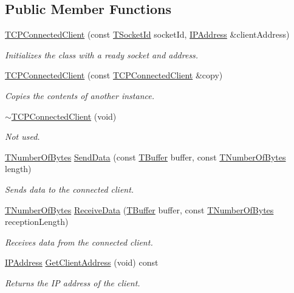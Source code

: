 \subsection*{Public Member Functions}
\begin{DoxyCompactItemize}
\item 
\hyperlink{class_t_c_p_connected_client_a6e1c47791a6603dfe5cacf425587f27b}{T\-C\-P\-Connected\-Client} (const \hyperlink{class_socket_base_aad53265037e46768af4d6a0c2ebed277}{T\-Socket\-Id} socket\-Id, \hyperlink{class_i_p_address}{I\-P\-Address} \&client\-Address)
\begin{DoxyCompactList}\small\item\em Initializes the class with a ready socket and address. \end{DoxyCompactList}\item 
\hyperlink{class_t_c_p_connected_client_a58e14efd1eccd877ec8dc4a3a0d6211d}{T\-C\-P\-Connected\-Client} (const \hyperlink{class_t_c_p_connected_client}{T\-C\-P\-Connected\-Client} \&copy)
\begin{DoxyCompactList}\small\item\em Copies the contents of another instance. \end{DoxyCompactList}\item 
\hyperlink{class_t_c_p_connected_client_aaf6bba3a6621001a030d36e117f9dd5e}{$\sim$\-T\-C\-P\-Connected\-Client} (void)
\begin{DoxyCompactList}\small\item\em Not used. \end{DoxyCompactList}\item 
\hyperlink{class_socket_base_ac414903631491453b96e71c06c2c2e72}{T\-Number\-Of\-Bytes} \hyperlink{class_t_c_p_connected_client_a7c3a1d1172f3880b48d35ffbf255712d}{Send\-Data} (const \hyperlink{class_socket_base_a1557d64029a25c20b4c306b80efcc143}{T\-Buffer} buffer, const \hyperlink{class_socket_base_ac414903631491453b96e71c06c2c2e72}{T\-Number\-Of\-Bytes} length)
\begin{DoxyCompactList}\small\item\em Sends data to the connected client. \end{DoxyCompactList}\item 
\hyperlink{class_socket_base_ac414903631491453b96e71c06c2c2e72}{T\-Number\-Of\-Bytes} \hyperlink{class_t_c_p_connected_client_a6bfa3ec7dc46c17dbccde8383c3253da}{Receive\-Data} (\hyperlink{class_socket_base_a1557d64029a25c20b4c306b80efcc143}{T\-Buffer} buffer, const \hyperlink{class_socket_base_ac414903631491453b96e71c06c2c2e72}{T\-Number\-Of\-Bytes} reception\-Length)
\begin{DoxyCompactList}\small\item\em Receives data from the connected client. \end{DoxyCompactList}\item 
\hyperlink{class_i_p_address}{I\-P\-Address} \hyperlink{class_t_c_p_connected_client_a41e3600f6ae8c52a2a4a8eb1351bf200}{Get\-Client\-Address} (void) const 
\begin{DoxyCompactList}\small\item\em Returns the I\-P address of the client. \end{DoxyCompactList}\end{DoxyCompactItemize}
